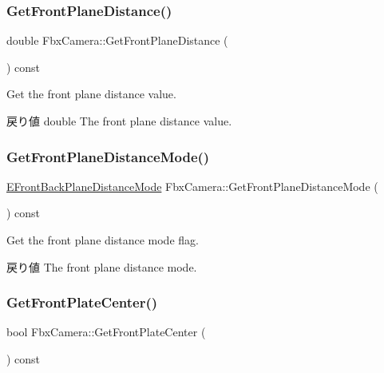 \subsubsection{\texorpdfstring{Get\+Front\+Plane\+Distance()}{GetFrontPlaneDistance()}}
{\footnotesize\ttfamily double Fbx\+Camera\+::\+Get\+Front\+Plane\+Distance (\begin{DoxyParamCaption}{ }\end{DoxyParamCaption}) const}

Get the front plane distance value. \begin{DoxyReturn}{戻り値}
double The front plane distance value. 
\end{DoxyReturn}
\mbox{\label{class_fbx_camera_a2923892fe43a8d86e9a2902d94672dfe}} 
\subsubsection{\texorpdfstring{Get\+Front\+Plane\+Distance\+Mode()}{GetFrontPlaneDistanceMode()}}
{\footnotesize\ttfamily \hyperlink{class_fbx_camera_a79e74898d117e741c3fbd10b1ef21c79}{E\+Front\+Back\+Plane\+Distance\+Mode} Fbx\+Camera\+::\+Get\+Front\+Plane\+Distance\+Mode (\begin{DoxyParamCaption}{ }\end{DoxyParamCaption}) const}

Get the front plane distance mode flag. \begin{DoxyReturn}{戻り値}
The front plane distance mode. 
\end{DoxyReturn}
\mbox{\label{class_fbx_camera_a1ddaac65643a80442f19b5a330075903}} 
\subsubsection{\texorpdfstring{Get\+Front\+Plate\+Center()}{GetFrontPlateCenter()}}
{\footnotesize\ttfamily bool Fbx\+Camera\+::\+Get\+Front\+Plate\+Center (\begin{DoxyParamCaption}{ }\end{DoxyParamCaption}) const}

